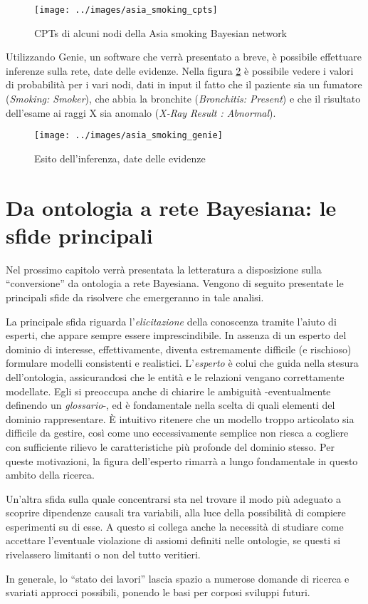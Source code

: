 \begin{figure}[H]
	\centering
	\texttt{[image: ../images/asia\_smoking\_cpts]}
	\caption[CPTs di alcuni nodi della Asia smoking Bayesian network]{CPTs di alcuni nodi della Asia smoking Bayesian network}
	\label{fig:asiasmokingcpts}
\end{figure}


Utilizzando Genie\cite{genie}, un software che verrà presentato a breve, è possibile effettuare inferenze sulla rete, date delle evidenze. Nella figura \ref{fig:asiasmokinggenie} è possibile vedere i valori di probabilità per i vari nodi, dati in input il fatto che il paziente sia un fumatore (\textit{Smoking: Smoker}), che abbia la bronchite (\textit{Bronchitis: Present}) e che il risultato dell'esame ai raggi X sia anomalo (\textit{X-Ray Result : Abnormal}).

\begin{figure}[H]
	\centering
	\texttt{[image: ../images/asia\_smoking\_genie]}
	\caption[Esito dell'inferenza, date delle evidenze]{Esito dell'inferenza, date delle evidenze}
	\label{fig:asiasmokinggenie}
\end{figure}




\section{Da ontologia a rete Bayesiana: le sfide principali}
Nel prossimo capitolo verrà presentata la letteratura a disposizione sulla ``conversione'' da ontologia a rete Bayesiana. Vengono di seguito presentate le principali sfide da risolvere che emergeranno in tale analisi.

La principale sfida riguarda l'\textit{elicitazione} della conoscenza tramite l'aiuto di esperti, che appare sempre essere imprescindibile. In assenza di un esperto del dominio di interesse, effettivamente, diventa estremamente difficile (e rischioso) formulare modelli consistenti e realistici. L'\textit{esperto} è colui che guida nella stesura dell'ontologia, assicurandosi che le entità e le relazioni vengano correttamente modellate. Egli si preoccupa anche di chiarire le ambiguità -eventualmente definendo un \textit{glossario}-, ed è fondamentale nella scelta di quali elementi del dominio rappresentare. 
È intuitivo ritenere che un modello troppo articolato sia difficile da gestire, così come uno eccessivamente semplice non riesca a cogliere con sufficiente rilievo le caratteristiche più profonde del dominio stesso. Per queste motivazioni, la figura dell'esperto rimarrà a lungo fondamentale in questo ambito della ricerca.

Un'altra sfida sulla quale concentrarsi sta nel trovare il modo più adeguato a scoprire dipendenze causali tra variabili, alla luce della possibilità di compiere esperimenti su di esse. A questo si collega anche la necessità di studiare come accettare l'eventuale violazione di assiomi definiti nelle ontologie, se questi si rivelassero limitanti o non del tutto veritieri.

In generale, lo ``stato dei lavori'' lascia spazio a numerose domande di ricerca e svariati approcci possibili, ponendo le basi per corposi sviluppi futuri.
